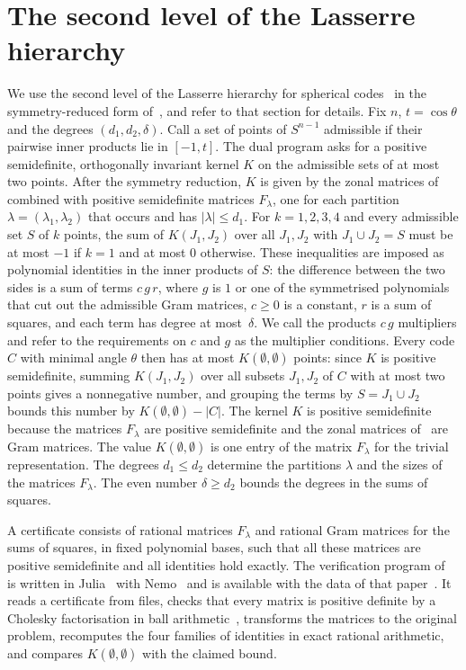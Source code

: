 \documentclass[11pt]{amsart}
\theoremstyle{remark}
\begin{document}
\section{The second level of the Lasserre hierarchy}\label{sec:method}

We use the second level of the Lasserre hierarchy for spherical codes~\cite{dLV} in the symmetry-reduced form of~\cite[Section~4]{LLM}, and refer to that section for details. Fix $n$, $t=\cos\theta$ and the degrees $(d_1,d_2,\delta)$. Call a set of points of $S^{n-1}$ admissible if their pairwise inner products lie in $[-1,t]$. The dual program asks for a positive semidefinite, orthogonally invariant kernel $K$ on the admissible sets of at most two points. After the symmetry reduction, $K$ is given by the zonal matrices of~\cite{LLM} combined with positive semidefinite matrices $F_\lambda$, one for each partition $\lambda=(\lambda_1,\lambda_2)$ that occurs and has $|\lambda|\le d_1$. For $k=1,2,3,4$ and every admissible set $S$ of $k$ points, the sum of $K(J_1,J_2)$ over all $J_1,J_2$ with $J_1\cup J_2=S$ must be at most $-1$ if $k=1$ and at most $0$ otherwise. These inequalities are imposed as polynomial identities in the inner products of $S$: the difference between the two sides is a sum of terms $c\,g\,r$, where $g$ is $1$ or one of the symmetrised polynomials that cut out the admissible Gram matrices, $c\ge0$ is a constant, $r$ is a sum of squares, and each term has degree at most~$\delta$. We call the products $c\,g$ multipliers and refer to the requirements on $c$ and $g$ as the multiplier conditions. Every code $C$ with minimal angle $\theta$ then has at most $K(\emptyset,\emptyset)$ points: since $K$ is positive semidefinite, summing $K(J_1,J_2)$ over all subsets $J_1,J_2$ of $C$ with at most two points gives a nonnegative number, and grouping the terms by $S=J_1\cup J_2$ bounds this number by $K(\emptyset,\emptyset)-|C|$. The kernel $K$ is positive semidefinite because the matrices $F_\lambda$ are positive semidefinite and the zonal matrices of~\cite{LLM} are Gram matrices. The value $K(\emptyset,\emptyset)$ is one entry of the matrix $F_\lambda$ for the trivial representation. The degrees $d_1\le d_2$ determine the partitions $\lambda$ and the sizes of the matrices $F_\lambda$. The even number $\delta\ge d_2$ bounds the degrees in the sums of squares.

A certificate consists of rational matrices $F_\lambda$ and rational Gram matrices for the sums of squares, in fixed polynomial bases, such that all these matrices are positive semidefinite and all identities hold exactly. The verification program of~\cite{LLM} is written in Julia~\cite{Julia} with Nemo~\cite{Nemo} and is available with the data of that paper~\cite{LLMdata}. It reads a certificate from files, checks that every matrix is positive definite by a Cholesky factorisation in ball arithmetic~\cite{Arb}, transforms the matrices to the original problem, recomputes the four families of identities in exact rational arithmetic, and compares $K(\emptyset,\emptyset)$ with the claimed bound.
\end{document}
